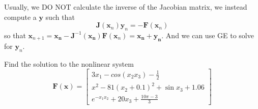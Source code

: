 Usually, we DO NOT calculate the inverse of the Jacobian matrix, we instead compute a $\mathbf{y}$ such that
\[ \mathbf{J}(\mathbf{x}_n)\mathbf{y}_n = -\mathbf{F}(\mathbf{x}_n) \]
so that $\mathbf{x}_{n+1} = \mathbf{x_n} -\mathbf{J}^{-1}(\mathbf{x_n})\mathbf{F}(\mathbf{x}_n) = \mathbf{x_n+y_n} $. And we can use GE to solve for $\mathbf{y}_n$.

\begin{ex}
	Find the solution to the nonlinear system 
	\[ \mathbf{F}(\mathbf{x}) = \begin{bmatrix}
	3x_1 - cos(x_2x_3) - \frac{1}{2}\\
	x^2 - 81(x_2 + 0.1)^2 +\sin x_3 + 1.06\\
	e^{-x_1x_2} + 20x_3 + \frac{10\pi - 3}{3}
	\end{bmatrix} \]
\end{ex}
